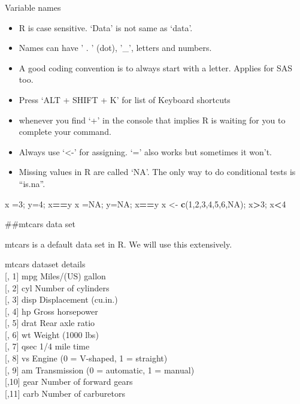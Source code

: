 \documentclass[ignorenonframetext,]{beamer}
\newenvironment{Shaded}{\begin{snugshade}}{\end{snugshade}}
\newcommand{\DecValTok}[1]{\textcolor[rgb]{0.00,0.00,0.81}{#1}}
\newcommand{\KeywordTok}[1]{\textcolor[rgb]{0.13,0.29,0.53}{\textbf{#1}}}
\newcommand{\NormalTok}[1]{#1}
\newcommand{\OperatorTok}[1]{\textcolor[rgb]{0.81,0.36,0.00}{\textbf{#1}}}
\newcommand{\OtherTok}[1]{\textcolor[rgb]{0.56,0.35,0.01}{#1}}
\newcommand{\StringTok}[1]{\textcolor[rgb]{0.31,0.60,0.02}{#1}}
\begin{document}
\begin{frame}[fragile]{Variable names}
\protect\hypertarget{variable-names}{}

\begin{itemize}
\item
  R is case sensitive. `Data' is not same as `data'.
\item
  Names can have ' . ' (dot), '\_', letters and numbers.
\item
  A good coding convention is to always start with a letter. Applies for
  SAS too.
\item
  Press `ALT + SHIFT + K' for list of Keyboard shortcuts
\item
  whenever you find `+' in the console that implies R is waiting for you
  to complete your command.
\item
  Always use `\textless{}-' for assigning. `=' also works but sometimes
  it won't.
\item
  Missing values in R are called `NA'. The only way to do conditional
  tests is ``is.na''.
\end{itemize}

\begin{Shaded}
\begin{Highlighting}[]
\NormalTok{x =}\DecValTok{3}\NormalTok{; y=}\DecValTok{4}\NormalTok{; x}\OperatorTok{==}\NormalTok{y}
\NormalTok{x =}\OtherTok{NA}\NormalTok{; y=}\OtherTok{NA}\NormalTok{; x}\OperatorTok{==}\NormalTok{y}
\NormalTok{x <-}\StringTok{ }\KeywordTok{c}\NormalTok{(}\DecValTok{1}\NormalTok{,}\DecValTok{2}\NormalTok{,}\DecValTok{3}\NormalTok{,}\DecValTok{4}\NormalTok{,}\DecValTok{5}\NormalTok{,}\DecValTok{6}\NormalTok{,}\OtherTok{NA}\NormalTok{); x}\OperatorTok{>}\DecValTok{3}\NormalTok{; x}\OperatorTok{<}\DecValTok{4}
\end{Highlighting}
\end{Shaded}

\#\#mtcars data set

mtcars is a default data set in R. We will use this extensively.

mtcars dataset details\\
{[}, 1{]} mpg Miles/(US) gallon\\
{[}, 2{]} cyl Number of cylinders\\
{[}, 3{]} disp Displacement (cu.in.)\\
{[}, 4{]} hp Gross horsepower\\
{[}, 5{]} drat Rear axle ratio\\
{[}, 6{]} wt Weight (1000 lbs)\\
{[}, 7{]} qsec 1/4 mile time\\
{[}, 8{]} vs Engine (0 = V-shaped, 1 = straight)\\
{[}, 9{]} am Transmission (0 = automatic, 1 = manual)\\
{[},10{]} gear Number of forward gears\\
{[},11{]} carb Number of carburetors


\end{frame}
\end{document}
